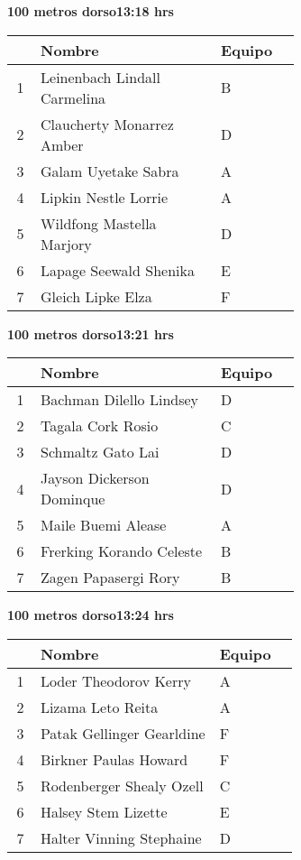 \begin{minipage}{0.95\linewidth}
\begin{center}
\textbf{
100 metros dorso\hspace{1cm}13:18 hrs}
\end{center}
\begin{tabular}{cp{0.63\linewidth}l}
\hline
& \textbf{Nombre} & \textbf{Equipo} \\ \hline
1 & Leinenbach Lindall Carmelina & B \\ 
2 & Claucherty Monarrez Amber & D \\ 
3 & Galam Uyetake Sabra & A \\ 
4 & Lipkin Nestle Lorrie & A \\ 
5 & Wildfong Mastella Marjory & D \\ 
6 & Lapage Seewald Shenika & E \\ 
7 & Gleich Lipke Elza & F \\ 
\end{tabular}
\end{minipage}
\begin{minipage}{0.95\linewidth}
\begin{center}
\textbf{
100 metros dorso\hspace{1cm}13:21 hrs}
\end{center}
\begin{tabular}{cp{0.63\linewidth}l}
\hline
& \textbf{Nombre} & \textbf{Equipo} \\ \hline
1 & Bachman Dilello Lindsey & D \\ 
2 & Tagala Cork Rosio & C \\ 
3 & Schmaltz Gato Lai & D \\ 
4 & Jayson Dickerson Dominque & D \\ 
5 & Maile Buemi Alease & A \\ 
6 & Frerking Korando Celeste & B \\ 
7 & Zagen Papasergi Rory & B \\ 
\end{tabular}
\end{minipage}
\begin{minipage}{0.95\linewidth}
\begin{center}
\textbf{
100 metros dorso\hspace{1cm}13:24 hrs}
\end{center}
\begin{tabular}{cp{0.63\linewidth}l}
\hline
& \textbf{Nombre} & \textbf{Equipo} \\ \hline
1 & Loder Theodorov Kerry & A \\ 
2 & Lizama Leto Reita & A \\ 
3 & Patak Gellinger Gearldine & F \\ 
4 & Birkner Paulas Howard & F \\ 
5 & Rodenberger Shealy Ozell & C \\ 
6 & Halsey Stem Lizette & E \\ 
7 & Halter Vinning Stephaine & D \\ 
\end{tabular}
\end{minipage}
